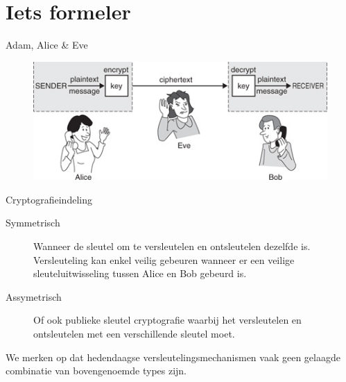\documentclass{beamer}
\begin{document}
\section{Iets formeler}

\begin{frame}{Adam, Alice \& Eve}
	\begin{figure}
		\includegraphics[width=\textwidth]{img/adameve.jpg}
	\end{figure}
\end{frame}

\begin{frame}{Cryptografieindeling}
	\begin{description}
		\item[Symmetrisch] Wanneer de sleutel om te versleutelen en ontsleutelen dezelfde is. Versleuteling kan enkel veilig gebeuren wanneer er een veilige sleuteluitwisseling tussen Alice en Bob gebeurd is.
	\item[Assymetrisch] Of ook publieke sleutel cryptografie waarbij het versleutelen en ontsleutelen met een verschillende sleutel moet. 
\end{description}
We merken op dat hedendaagse versleutelingsmechanismen vaak geen gelaagde combinatie van bovengenoemde types zijn.
\end{frame}

\end{document}
